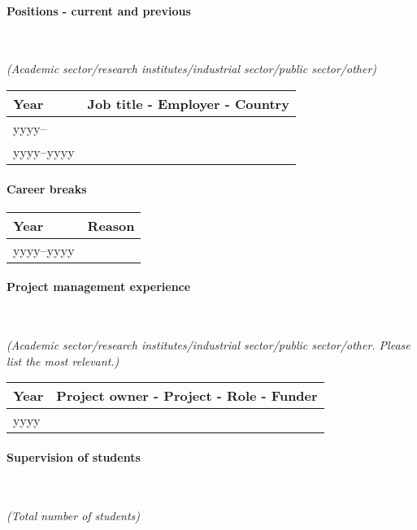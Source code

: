 \documentclass[cv,partner]{nfr}
\begin{document}
\paragraph{Positions - current and previous} ~

\noindent\textit{(Academic sector/research institutes/industrial sector/public
sector/other)}

\begin{longtable}{
| >{\raggedright}p{2.45cm} %
    | >{\raggedright\arraybackslash}p{13.65cm} | }
    \hline
    \rowcolor{tablegray} Year & Job title - Employer - Country \\
    \hline
    yyyy-- & ~ \\
    \hline
    yyyy--yyyy & ~ \\
    \hline
\end{longtable}

\paragraph{Career breaks}
\begin{longtable}{
| >{\raggedright}p{2.45cm} %
    | >{\raggedright\arraybackslash}p{13.65cm} | }
    \hline
    \rowcolor{tablegray} Year & Reason \\
    \hline
    yyyy--yyyy & ~ \\
    \hline
\end{longtable}

\paragraph{Project management experience} ~

\noindent\textit{(Academic sector/research institutes/industrial sector/public sector/other. Please list the most relevant.)}
\begin{longtable}{
| >{\raggedright}p{2.45cm} %
    | >{\raggedright\arraybackslash}p{13.65cm} | }
    \hline
    \rowcolor{tablegray} Year & Project owner - Project - Role - Funder \\
    \hline
    yyyy & ~ \\
    \hline
\end{longtable}

\paragraph{Supervision of students} ~

\noindent\textit{(Total number of students)}
\end{document}
